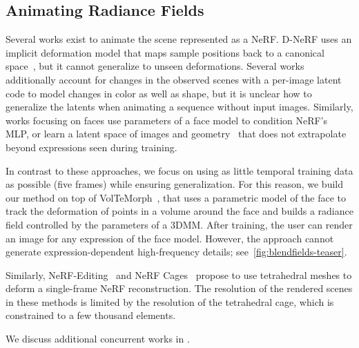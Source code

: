   \subsection{Animating Radiance Fields}
    Several works exist to animate the scene represented as a NeRF.
    D-NeRF uses an implicit deformation model that maps sample positions back
    to a canonical space~\cite{pumarola2021d}, but it cannot generalize to
    unseen deformations.
    Several works \cite{park2021nerfies, park2021hypernerf, gafni2021dynamic,
    tretschk2021non} additionally account for changes in the observed scenes
    with a per-image latent code to model changes in color as well as shape,
    but it is unclear how to generalize the latents when animating a sequence
    without input images.
    Similarly, works focusing on faces
    \cite{gafni2021dynamic,athar2022rignerf,zhuang2021mofanerf,gao2022reconstructing}
    use parameters of a face model to condition NeRF's MLP, or learn a latent
    space of images and
    geometry~\cite{cao2022authentic,wang2022morf,lombardi2019neural,mihajlovic2022keypointnerf,ma2021pixel,lombardi2021mixture}
    that does not extrapolate beyond expressions seen during training.

    In contrast to these approaches, we focus on using as little temporal
    training data as possible (\ie five frames) while ensuring generalization.
    For this reason, we build our method on top of
    VolTeMorph~\cite{garbin2024voltemorph}, that uses a parametric model of
    the face to track the deformation of points in a volume around the face
    and builds a radiance field controlled by the parameters of a 3DMM.
    After training, the user can render an image for any expression of the
    face model.
    However, the approach cannot generate expression-dependent high-frequency
    details; see~\cref{fig:blendfields-teaser}.

    Similarly, NeRF-Editing~\cite{yuan2022nerf} and NeRF
    Cages~\cite{xu2022deforming} propose to use tetrahedral meshes to deform a
    single-frame NeRF reconstruction.
    The resolution of the rendered scenes in these methods is limited by the
    resolution of the tetrahedral cage, which is constrained to a few thousand
    elements.

    We discuss additional concurrent works in \supplementary{}.

